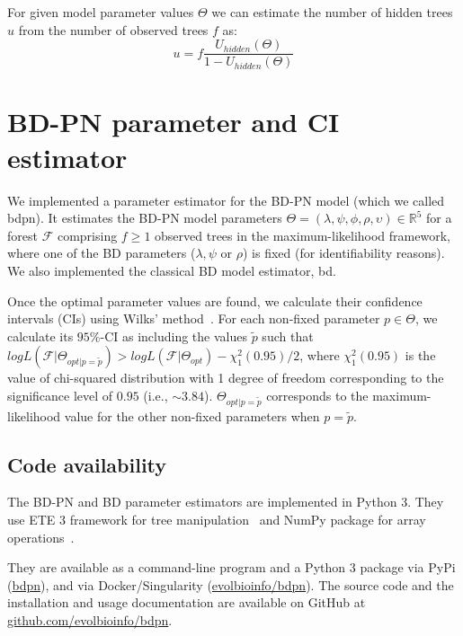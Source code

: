 \documentclass[a4paper,10pt]{article}
\begin{document}
For given model parameter values $\Theta$ we can estimate the number of hidden trees $u$ from the number of observed trees $f$ as:
\begin{equation}
u = f \frac{U_{hidden}(\Theta)}{1 - U_{hidden}(\Theta)}\label{eq:u} 
\end{equation}


\section{BD-PN parameter and CI estimator}\label{sec:sim}
We implemented a parameter estimator for the BD-PN model (which we called bdpn). It estimates the BD-PN model parameters  $\Theta = (\lambda,\psi,\phi,\rho,\upsilon) \in \mathbb{R}^5$ for a forest $\mathscr{F}$ comprising $f \geq 1$ observed trees in the maximum-likelihood framework, where one of the BD parameters ($\lambda,\psi$ or $\rho$) is fixed (for identifiability reasons). We also implemented the classical BD model estimator, bd.

Once the optimal parameter values are found, we calculate their confidence intervals (CIs) using Wilks' method~\citep{Wilks1938}.
For each non-fixed parameter $p \in \Theta$, we calculate its $95\%$-CI as including the values $\tilde{p}$ such that $log L(\mathscr{F}|\Theta_{opt|p=\tilde{p}}) > log L(\mathscr{F}| \Theta_{opt}) - \chi^2_1(0.95) / 2$, where $\chi^2_1(0.95)$ is the value of chi-squared distribution with 1 degree of freedom corresponding to the significance level of $0.95$ (i.e., $\sim3.84$). $\Theta_{opt|p=\tilde{p}}$ corresponds to the maximum-likelihood value for the other non-fixed parameters when $p = \tilde{p}$. 

\subsection*{Code availability}
The BD-PN and BD parameter estimators are implemented in Python 3. They use ETE 3 framework for tree manipulation~\citep{Huerta-Cepas2016} and NumPy package for array operations~\citep{harris_array_2020}. 

They are available as a command-line program and a Python 3 package via PyPi (\href{https://pypi.org/project/bdpn}{bdpn}), and via Docker/Singularity (\href{https://hub.docker.com/r/evolbioinfo/bdpn/tags}{evolbioinfo/bdpn}). The source code and the installation and usage documentation are available on GitHub at \href{https://github.com/evolbioinfo/bdpn}{github.com/evolbioinfo/bdpn}.
\end{document}

